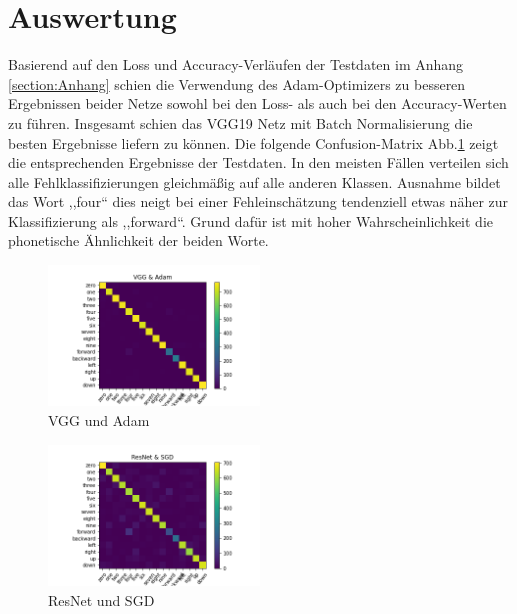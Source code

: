 \documentclass[sigconf]{acmart}
\begin{document}
\section{Auswertung}
Basierend auf den Loss und Accuracy-Verläufen der Testdaten im Anhang \ref{section:Anhang} schien die Verwendung des Adam-Optimizers zu besseren Ergebnissen beider Netze sowohl bei den Loss- als auch bei den Accuracy-Werten zu führen. Insgesamt schien das VGG19 Netz mit Batch Normalisierung die besten Ergebnisse liefern zu können.  
\newline
\newline
Die folgende Confusion-Matrix Abb.\ref{fig:Confusion-Matrix_VGG_Adam} zeigt die entsprechenden Ergebnisse der Testdaten. In den meisten Fällen verteilen sich alle Fehlklassifizierungen gleichmäßig auf alle anderen Klassen. Ausnahme bildet das Wort ,,four“ dies neigt bei einer Fehleinschätzung tendenziell etwas näher zur Klassifizierung als ,,forward“. Grund dafür ist mit hoher Wahrscheinlichkeit die phonetische Ähnlichkeit der beiden Worte.
\begin{figure}[ht]
  \includegraphics[width=0.5\textwidth]{images/Confusion-Matrix_VGG_Adam}
  \caption{VGG und Adam}
  \Description{}
  \label{fig:Confusion-Matrix_VGG_Adam}
\end{figure} 

\begin{figure}[ht]
  \includegraphics[width=0.5\textwidth]{images/Confusion-Matrix_ResNet_SGD}
  \caption{ResNet und SGD}
  \Description{}
  \label{fig:Confusion-Matrix_ResNet_SGD}
\end{figure} 
\end{document}
